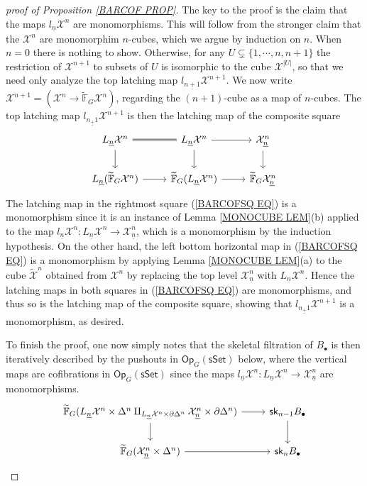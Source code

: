 \documentclass[a4paper,10pt]{article}%
\begin{document}
\begin{proof}[proof of Proposition \ref{BARCOF PROP}]
The key to the proof is the claim that the maps
$l_{\underline{n}} \mathcal{X}^n$
are monomorphisms. This will follow from the stronger claim that the $\mathcal{X}^n$
are monomorphim $n$-cubes, which we argue by induction on $n$.
When $n=0$ there is nothing to show.
Otherwise, for any 
$U \subsetneq \{1,\cdots,n,n+1\}$
the restriction of $\mathcal{X}^{n+1}$ to subsets of
$U$ is isomorphic to the cube $\mathcal{X}^{|U|}$,
so that we need only analyze the top
latching map $l_{\underline{n+1}} \mathcal{X}^{n+1}$.
We now write
$\mathcal{X}^{n+1} = (\mathcal{X}^n \to 
\widetilde{\mathbb{F}}_G \mathcal{X}^n)$, regarding the $(n+1)$-cube as a map of $n$-cubes.
The top latching map $l_{\underline{n_+1}} \mathcal{X}^{n+1}$
is then the latching map of the composite square
\begin{equation}\label{BARCOFSQ EQ}
\begin{tikzcd}
 	L_{\underline{n}} \mathcal{X}^n \ar{d} \ar[equal]{r}
&
	L_{\underline{n}} \mathcal{X}^n \ar{d}
	\ar{r}
&
	\mathcal{X}^n_{\underline{n}}
	\ar{d}
\\
	L_{\underline{n}} (\widetilde{\mathbb{F}}_G \mathcal{X}^n)
	\ar{r}
&
	\widetilde{\mathbb{F}}_G(L_{\underline{n}}  \mathcal{X}^n)
	\ar{r}
&
	\widetilde{\mathbb{F}}_G \mathcal{X}^n_{\underline{n}}
\end{tikzcd}
\end{equation}
The latching map in the rightmost square
(\ref{BARCOFSQ EQ})
is a monomorphism since it is an instance of
Lemma \ref{MONOCUBE LEM}(b)
applied to the map
$l_{\underline{n}} \mathcal{X}^n \colon 
L_{\underline{n}} \mathcal{X}^n \to \mathcal{X}^n_{\underline{n}}$, which is a monomorphism by the induction hypothesis.
On the other hand, the left bottom horizontal map in 
(\ref{BARCOFSQ EQ})
is a monomorphism
by applying Lemma \ref{MONOCUBE LEM}(a)
to the cube $\tilde{\mathcal{X}}^n$ obtained from 
$\mathcal{X}^n$ by replacing the top level
$\mathcal{X}^n_{\underline{n}}$ with
$L_{\underline{n}} \mathcal{X}^n$.
Hence the latching maps in both squares
in (\ref{BARCOFSQ EQ}) are monomorphisms, 
and thus so is the latching map of the composite square, showing that $l_{\underline{n_+1}} \mathcal{X}^{n+1}$
is a monomorphism, as desired.

To finish the proof, one now simply notes that the skeletal filtration of $B_{\bullet}$ is 
then iteratively described by the pushouts
in $\mathsf{Op}_{G}(\mathsf{sSet})$
below, where the vertical maps are cofibrations in 
$\mathsf{Op}_{G}(\mathsf{sSet})$
since the maps 
$l_{\underline{n}} \mathcal{X}^n \colon 
L_{\underline{n}} \mathcal{X}^n \to \mathcal{X}^n_{\underline{n}}$
are monomorphisms.
\[
\begin{tikzcd}
	\widetilde{\mathbb{F}}_G 
	(L_{\underline{n}} \mathcal{X}^n \times \Delta^n
	\amalg_{L_{\underline{n}} \mathcal{X}^n \times \partial\Delta^n}
	\mathcal{X}^n_{\underline{n}} \times \partial \Delta^n) 
	\ar{r} \ar{d} &
	\mathsf{sk}_{n-1} B_{\bullet} \ar{d}
\\
	\widetilde{\mathbb{F}}_G 
	(\mathcal{X}^n_{\underline{n}} \times \Delta^n) 
	\ar{r} & \mathsf{sk}_{n} B_{\bullet}
\end{tikzcd}
\]
\end{proof}
\end{document}
